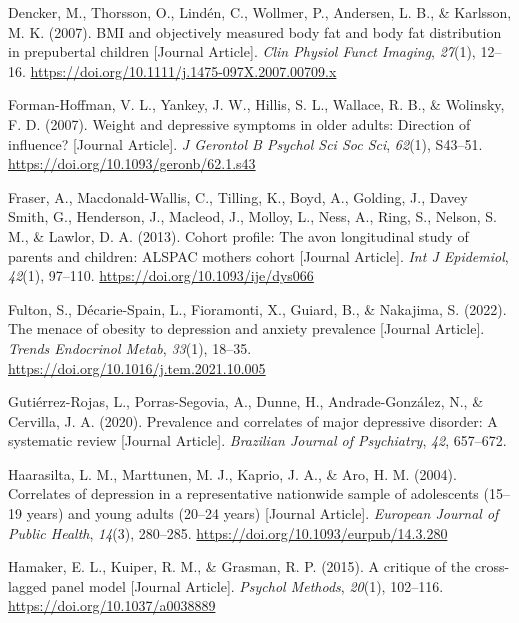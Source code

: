 \documentclass[
  letterpaper,
  DIV=11,
  numbers=noendperiod]{scrreport}
\newlength{\cslhangindent}
\newenvironment{CSLReferences}[2] %
 {\begin{list}{}{%
  \setlength{\itemindent}{0pt}
  \setlength{\leftmargin}{0pt}
  \setlength{\parsep}{0pt}
  \ifodd #1
   \setlength{\leftmargin}{\cslhangindent}
   \setlength{\itemindent}{-1\cslhangindent}
  \fi
  \setlength{\itemsep}{#2\baselineskip}}}
 {\end{list}}
\begin{document}
\begin{CSLReferences}{1}{0}
Dencker, M., Thorsson, O., Lindén, C., Wollmer, P., Andersen, L. B., \&
Karlsson, M. K. (2007). BMI and objectively measured body fat and body
fat distribution in prepubertal children {[}Journal Article{]}.
\emph{Clin Physiol Funct Imaging}, \emph{27}(1), 12--16.
\url{https://doi.org/10.1111/j.1475-097X.2007.00709.x}

Forman-Hoffman, V. L., Yankey, J. W., Hillis, S. L., Wallace, R. B., \&
Wolinsky, F. D. (2007). Weight and depressive symptoms in older adults:
Direction of influence? {[}Journal Article{]}. \emph{J Gerontol B
Psychol Sci Soc Sci}, \emph{62}(1), S43--51.
\url{https://doi.org/10.1093/geronb/62.1.s43}

Fraser, A., Macdonald-Wallis, C., Tilling, K., Boyd, A., Golding, J.,
Davey Smith, G., Henderson, J., Macleod, J., Molloy, L., Ness, A., Ring,
S., Nelson, S. M., \& Lawlor, D. A. (2013). Cohort profile: The avon
longitudinal study of parents and children: ALSPAC mothers cohort
{[}Journal Article{]}. \emph{Int J Epidemiol}, \emph{42}(1), 97--110.
\url{https://doi.org/10.1093/ije/dys066}

Fulton, S., Décarie-Spain, L., Fioramonti, X., Guiard, B., \& Nakajima,
S. (2022). The menace of obesity to depression and anxiety prevalence
{[}Journal Article{]}. \emph{Trends Endocrinol Metab}, \emph{33}(1),
18--35. \url{https://doi.org/10.1016/j.tem.2021.10.005}

Gutiérrez-Rojas, L., Porras-Segovia, A., Dunne, H., Andrade-González,
N., \& Cervilla, J. A. (2020). Prevalence and correlates of major
depressive disorder: A systematic review {[}Journal Article{]}.
\emph{Brazilian Journal of Psychiatry}, \emph{42}, 657--672.

Haarasilta, L. M., Marttunen, M. J., Kaprio, J. A., \& Aro, H. M.
(2004). Correlates of depression in a representative nationwide sample
of adolescents (15--19 years) and young adults (20--24 years) {[}Journal
Article{]}. \emph{European Journal of Public Health}, \emph{14}(3),
280--285. \url{https://doi.org/10.1093/eurpub/14.3.280}

Hamaker, E. L., Kuiper, R. M., \& Grasman, R. P. (2015). A critique of
the cross-lagged panel model {[}Journal Article{]}. \emph{Psychol
Methods}, \emph{20}(1), 102--116. \url{https://doi.org/10.1037/a0038889}


\end{CSLReferences}
\end{document}
